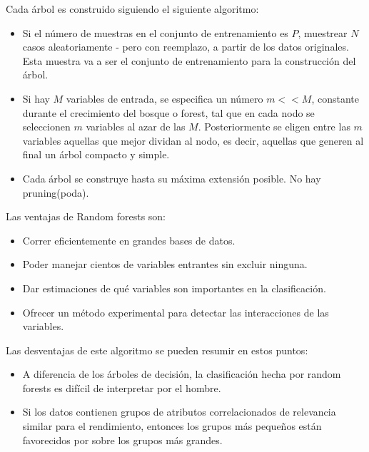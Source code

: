 	Cada árbol es construido siguiendo el siguiente algoritmo:
	\begin{itemize}
		\item Si el número de muestras en el conjunto de entrenamiento es $P$, muestrear $N$ casos aleatoriamente - pero con reemplazo, a partir de los datos originales. Esta muestra va a ser el conjunto de entrenamiento para la construcción del árbol.
		\item Si hay $M$ variables de entrada, se especifica un número $m<<M$, constante durante el crecimiento del bosque o forest, tal que en cada nodo se seleccionen $m$ variables al azar de las $M$. Posteriormente se eligen entre las $m$ variables aquellas que mejor dividan al nodo, es decir, aquellas que generen al final un árbol compacto y simple.
		\item Cada árbol se construye hasta su máxima extensión posible. No hay pruning(poda).
	\end{itemize}
	Las ventajas de Random forests son:
	\begin{itemize}
		\item Correr eficientemente en grandes bases de datos.
		\item Poder manejar cientos de variables entrantes sin excluir ninguna.
		\item Dar estimaciones de qué variables son importantes en la clasificación.
		\item Ofrecer un método experimental para detectar las interacciones de las variables.
	\end{itemize}
	Las desventajas de este algoritmo se pueden resumir en estos puntos:
	\begin{itemize}
		\item A diferencia de los árboles de decisión, la clasificación hecha por random forests es difícil de interpretar por el hombre.
		\item Si los datos contienen grupos de atributos correlacionados de relevancia similar para el rendimiento, entonces los grupos más pequeños están favorecidos por sobre los grupos más grandes.
	\end{itemize}
	
